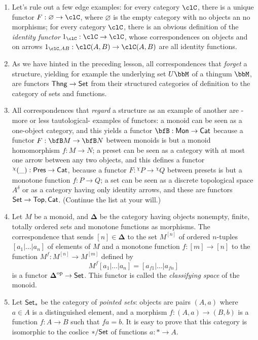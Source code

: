 \documentclass[11pt]{article}
\begin{document}
\begin{example}\leavevmode
	\begin{enumerate}
		\item  Let's rule out a few edge examples: for every category $\clC$, there is a unique functor $F : \varnothing \to \clC$, where $\varnothing$ is the empty category with no objects an no morphisms; for every category $\clC$, there is an obvious definition of the \emph{identity functor} $1_\clC : \clC \to \clC$, whose correspondences on objects and on arrows $1_{\clC, AB} : \clC(A,B) \to \clC(A,B)$ are all identity functions.
		\item  As we have hinted in the preceding lesson, all correspondences that \emph{forget} a structure, yielding for example the underlying set $U\bbM$ of a thingum $\bbM$, are functors ${\sf Thng} \to {\sf Set}$ from their structured categories of definition to the category of sets and functions.
		\item  All correspondences that \emph{regard} a structure as an example of another are -more or less tautological- examples of functors: a monoid can be seen as a one-object category, and this yields a functor $\bfB : {\sf Mon} \to {\sf Cat}$ because a functor $F : \bfB M \to \bfB N$ between monoids is but a monoid homomorphism $f : M \to N$; a preset can be seen as a category with at most one arrow between any two objects, and this defines a functor $^\chi(\_) : {\sf Pres} \to {\sf Cat}$, because a functor $F : {}^\chi P \to {}^\chi Q$ between presets is but a monotone function $f : P \to Q$; a set can be seen as a discrete topological space $A^\delta$ or as a category having only identity arrows, and these are functors ${\sf Set}\to {\sf Top}, {\sf Cat}$. (Continue the list at your will.)
		\item  Let $M$ be a monoid, and $\boldsymbol{\Delta}$ be the category having objects nonempty, finite, totally ordered sets and monotone functions as morphisms. The correspondence that sends $[n]\in\boldsymbol{\Delta}$ to the set $M^{[n]}$ of ordered $n$-tuples $[a_1|\dots|a_n]$ of elements of $M$ and a monotone function $f : [m]\to [n]$ to the function $M^f : M^{[n]}\to M^{[m]}$ defined by
		\[ M^f[a_1|\dots|a_n] = [a_{f1}|\dots|a_{fn}] \]
		is a functor $\boldsymbol{\Delta}^{\text{op}} \to \mathsf{Set}$. This functor is called the \emph{classifying space} of the monoid.
		\item  Let $\mathsf{Set}_*$ be the category of \emph{pointed sets}: objects are pairs $(A,a)$ where $a\in A$ is a distinguished element, and a morphism $f : (A,a) \to (B,b)$ is a function $f :A\to B$ such that $fa=b$. It is easy to prove that this category is isomorphic to the coslice  $*/\mathsf{Set}$ of functions $a : * \to A$.

\end{enumerate}
\end{example}
\end{document}
